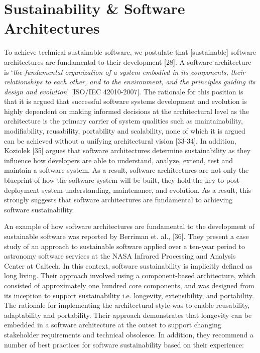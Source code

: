 \documentclass[preprint,12pt,authoryear]{elsarticle}
\begin{document}
\section{Sustainability \& Software Architectures}\label{sec:sust+softarch}

To achieve technical sustainable software, we postulate that
[sustainable] software architectures are fundamental to their
development [28]. A software architecture is `{\emph{the fundamental
organization of a system embodied in its components, their
relationships to each other, and to the environment, and the
principles guiding its design and evolution}}' [ISO/IEC
42010-2007]. The rationale for this position is that it is argued that
successful software systems development and evolution is highly
dependent on making informed decisions at the architectural level as
the architecture is the primary carrier of system qualities such as
maintainability, modifiability, reusability, portability and
scalability, none of which it is argued can be achieved without a
unifying architectural vision [33-34]. In addition, Koziolek [35]
argues that software architectures determine sustainability as they
influence how developers are able to understand, analyze, extend, test
and maintain a software system. As a result, software architectures
are not only the blueprint of how the software system will be built,
they hold the key to post-deployment system understanding,
maintenance, and evolution. As a result, this strongly suggests that
software architectures are fundamental to achieving software
sustainability.

An example of how software architectures are fundamental to the
development of sustainable software was reported by Berriman et. al.,
[36]. They present a case study of an approach to sustainable software
applied over a ten-year period to astronomy software services at the
NASA Infrared Processing and Analysis Center at Caltech. In this context,
software sustainability is implicitly defined as long living. Their
approach involved using a component-based architecture, which
consisted of approximately one hundred core components, and was
designed from its inception to support sustainability i.e. longevity,
extensibility, and portability. The rationale for implementing the
architectural style was to enable reusability, adaptability and
portability. Their approach demonstrates that longevity can be
embedded in a software architecture at the outset to support changing
stakeholder requirements and technical obsolesce. In addition, they
recommend a number of best practices for software sustainability based
on their experience:
\end{document}
